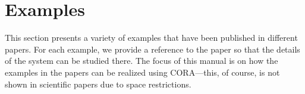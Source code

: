 \section{Examples} \label{sec:examples}

This section presents a variety of examples that have been published in different papers. For each example, we provide a reference to the paper so that the details of the system can be studied there. The focus of this manual is on how the examples in the papers can be realized using CORA---this, of course, is not shown in scientific papers due to space restrictions.







